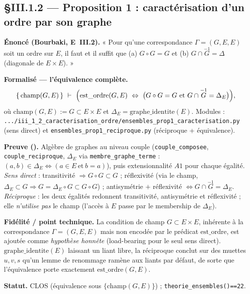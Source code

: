 
\subsection{§III.1.2 --- Proposition 1 : caractérisation d'un ordre par son graphe}
\textbf{Énoncé (Bourbaki, E~III.2).} « Pour qu'une correspondance $\Gamma=(G,E,E)$ soit
un ordre sur $E$, il faut et il suffit que (a) $G\circ G=G$ et (b) $G\cap\overset{-1}{G}=\Delta$
(diagonale de $E\times E$). »

\textbf{Formalisé --- l'équivalence complète.}
\[
  \{\,\mathrm{champ}(G,E)\,\}\ \vdash\ \Bigl(\mathrm{est\_ordre}(G,E)\ \Leftrightarrow\
  \bigl(G\circ G=G\ \text{et}\ G\cap\overset{-1}{G}=\Delta_E\bigr)\Bigr),
\]
où $\mathrm{champ}(G,E):=G\subset E\times E$ et $\Delta_E=\mathrm{graphe\_identite}(E)$.
Modules : \texttt{.../iii\_1\_2\_caracterisation\_ordre/ensembles\_prop1\_caracterisation.py}
(sens direct) et \texttt{ensembles\_prop1\_reciproque.py} (réciproque + équivalence).

\textbf{Preuve (\Nstar).} Algèbre de graphes au niveau couple (\texttt{couple\_composee},
\texttt{couple\_reciproque}, $\Delta_E$ via \texttt{membre\_graphe\_terme} : $(a,b)\in\Delta_E
\Leftrightarrow(a\in E\ \text{et}\ b=a)$), puis extensionnalité $A1$ pour chaque égalité.
\emph{Sens direct} : transitivité $\Rightarrow G\circ G\subset G$ ; réflexivité (via le
champ, $\Delta_E\subset G\Rightarrow G=\Delta_E\circ G\subset G\circ G$) ; antisymétrie
$+$ réflexivité $\Leftrightarrow G\cap\overset{-1}{G}=\Delta_E$. \emph{Réciproque} : les
deux égalités redonnent transitivité, antisymétrie et réflexivité ; elle \emph{n'utilise
pas} le champ (l'accès à $E$ passe par le membership de $\Delta_E$).

\textbf{Fidélité / point technique.} La condition de champ $G\subset E\times E$, inhérente
à la correspondance $\Gamma=(G,E,E)$ mais non encodée par le prédicat $\mathrm{est\_ordre}$,
est ajoutée comme \emph{hypothèse honnête} (load-bearing pour le seul sens direct).
$\mathrm{graphe\_identite}(E)$ laissant un liant libre, la réciproque conclut sur des
muettes $u,v,s$ qu'un lemme de renommage ramène aux liants par défaut, de sorte que
l'équivalence porte exactement $\mathrm{est\_ordre}(G,E)$.

\textbf{Statut.} CLOS (équivalence sous $\{\mathrm{champ}(G,E)\}$) ; \texttt{theorie\_ensembles()==22}.
